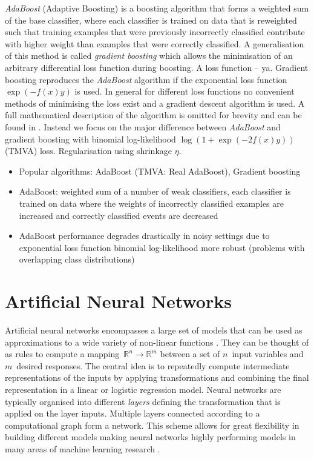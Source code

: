 
\emph{AdaBoost} (Adaptive Boosting) is a boosting algorithm that forms a
weighted sum of the base classifier, where each classifier is trained on data
that is reweighted such that training examples that were previously incorrectly
classified contribute with higher weight than examples that were correctly
classified.  A generalisation of this method is called \emph{gradient boosting}
which allows the minimisation of an arbitrary differential loss function during
boosting. A loss function -- ya. Gradient boosting reproduces the
\emph{AdaBoost} algorithm if the exponential loss function $\exp(-f(x) y)$ is
used. In general for different loss functions no convenient methods of
minimising the loss exist and a gradient descent algorithm is used. A full
mathematical description of the algorithm is omitted for brevity and can be
found in \cite{friedman_gbm, esl}. Instead we focus on the major difference
between \emph{AdaBoost} and gradient boosting with binomial log-likelihood
$\log\left( 1 + \exp(-2 f(x) y) \right)$ (TMVA) loss. Regularisation using
shrinkage $\eta$.


\begin{itemize}
\item Popular algorithms: AdaBoost (TMVA: Real AdaBoost), Gradient boosting

\item AdaBoost: weighted sum of a number of weak classifiers, each classifier is
  trained on data where the weights of incorrectly classified examples are
  increased and correctly classified events are decreased

\item AdaBoost performance degrades drastically in noisy settings due to
  exponential loss function \cite{esl} binomial log-likelihood more robust
  (problems with overlapping class distributions)

\end{itemize}

\section{Artificial Neural Networks}
\label{sec:nn}

Artificial neural networks encompasses a large set of models that can be used as
approximations to a wide variety of non-linear functions \cite{hornik}. They can
be thought of as rules to compute a
mapping~$\mathbb{R}^n \rightarrow \mathbb{R}^m$ between a set of $n$~input
variables and $m$~desired responses. The central idea is to repeatedly compute
intermediate representations of the inputs by applying transformations and
combining the final representation in a linear or logistic regression model.
Neural networks are typically organised into different \emph{layers} defining
the transformation that is applied on the layer inputs. Multiple layers
connected according to a computational graph form a network. This scheme allows
for great flexibility in building different models making neural networks highly
performing models in many areas of machine learning research .

